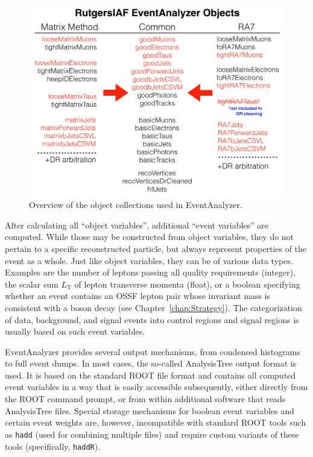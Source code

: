 \begin{figure}
\begin{center}
	\includegraphics[width=\textwidth]{Appendix/EventAnalyzer}
	\caption{Overview of the object collections used in EventAnalyzer.
	\label{fig:EventAnalyzer}}
\end{center}
\end{figure}

After calculating all ``object variables'', additional ``event variables'' are computed. While those may be constructed from object variables, they do not pertain to a specific reconstructed particle, but always represent properties of the event as a whole. Just like object variables, they can be of various data types. Examples are the number of leptons passing all quality requirements (integer), the scalar sum $L_\textrm{T}$ of lepton transverse momenta (float), or a boolean specifying whether an event contains an OSSF lepton pair whose invariant mass is consistent with a \Z boson decay (see Chapter~\ref{chap:Strategy}). The categorization of data, background, and signal events into control regions and signal regions is usually based on such event variables.

EventAnalyzer provides several output mechanisms, from condensed histograms to full event dumps. In most cases, the so-called AnalysisTree output format is used. It is based on the standard ROOT file format and contains all computed event variables in a way that is easily accessible subsequently, either directly from the ROOT command prompt, or from within additional software that reads AnalysisTree files. Special storage mechanisms for boolean event variables and certain event weights are, however, incompatible with standard ROOT tools such as \texttt{hadd} (used for combining multiple files) and require custom variants of these tools (specifically, \texttt{haddR}).

